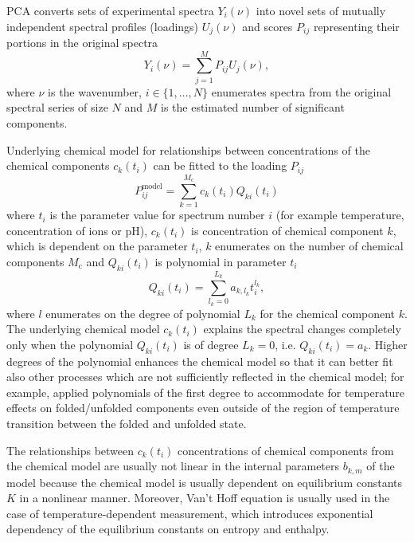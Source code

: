 PCA converts sets of experimental spectra $Y_i(\nu)$
into novel sets of mutually independent spectral profiles (loadings)
$U_j(\nu)$ and scores $P_{ij}$ representing their portions in the original
spectra
\begin{equation*}
	Y_i(\nu) = \sum_{j=1}^M P_{ij}U_j(\nu),
\end{equation*}
where $\nu$ is the wavenumber, $i \in \{1,\dots,N\}$ enumerates spectra from
the original spectral series of size $N$ and $M$ is the estimated number of
significant components.

Underlying chemical model for relationships between concentrations of the
chemical components $c_k(t_i)$ can be fitted to the loading $P_{ij}$
\begin{equation*}
	P_{ij}^\text{model} = \sum_{k=1}^{M_\text{c}} c_k(t_i) Q_{ki}(t_i)
\end{equation*}
where $t_i$ is the parameter value for spectrum number $i$ (for example
temperature, concentration of ions or pH),
$c_k(t_i)$ is concentration of chemical component $k$, which is dependent on
the parameter $t_i$,
$k$ enumerates on the number of chemical components $M_\text{c}$ and
$Q_{ki}(t_i)$ is polynomial in parameter $t_i$
\begin{equation*}
	Q_{ki}(t_i) = \sum_{l_k=0}^{L_k} a_{k,l_k} t_i^{l_k},
\end{equation*}
where $l$ enumerates on the degree of polynomial $L_k$ for the chemical
component $k$.
The underlying chemical model $c_k(t_i)$ explains the spectral changes
completely only when the polynomial $Q_{ki}(t_i)$ is of degree
$L_k = 0$, i.e. $Q_{ki}(t_i) = a_k$.
Higher degrees of the polynomial enhances the chemical model so that it can
better fit also other processes which are not sufficiently reflected in the
chemical model; for example,
\textcite{Klener2021}
applied polynomials of the first degree to accommodate for temperature effects
on folded/unfolded components even outside of the region of temperature
transition between the folded and unfolded state.

The relationships between $c_k(t_i)$ concentrations of chemical components from
the chemical model are usually not linear in the internal parameters $b_{k,m}$
of the model because the chemical model is usually dependent on equilibrium
constants $K$ in a nonlinear manner.
Moreover, Van't Hoff equation is usually used in the case of
temperature-dependent measurement, which introduces exponential dependency of
the equilibrium constants on entropy and enthalpy.

